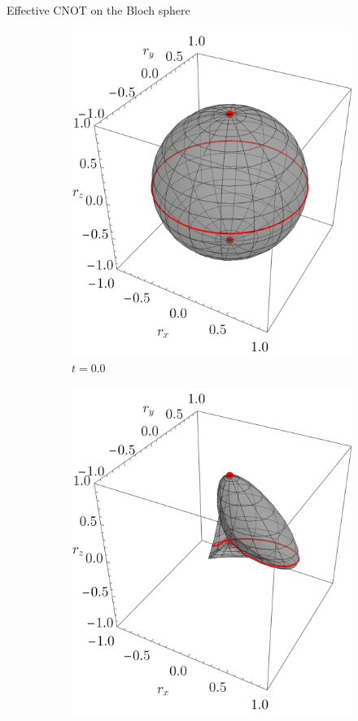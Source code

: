 \begin{frame}{Effective CNOT on the Bloch sphere}
    \begin{figure}[h!]
        \centering
        \begin{subfigure}{0.32\textwidth}
            \centering
            \includegraphics[width=0.9\linewidth]{figures/maxent_results/CNOT_p=0.5_t=0._r=0.9.png}
            \caption{$t=0.0$}
        \end{subfigure}%
        \begin{subfigure}{0.32\textwidth}
            \centering
            \includegraphics[width=0.9\linewidth]{figures/maxent_results/CNOT_p=0.5_t=1._r=0.9.png}

\end{subfigure}
\end{figure}
\end{frame}
